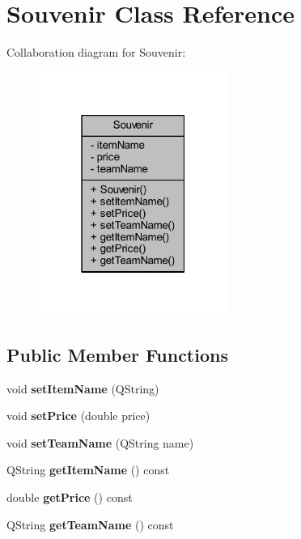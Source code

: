 \hypertarget{class_souvenir}{}\section{Souvenir Class Reference}
\label{class_souvenir}


Collaboration diagram for Souvenir\+:\nopagebreak
\begin{figure}[H]
\begin{center}
\leavevmode
\includegraphics[width=175pt]{class_souvenir__coll__graph}
\end{center}
\end{figure}
\subsection*{Public Member Functions}
\begin{DoxyCompactItemize}
\item 
\mbox{\label{class_souvenir_a968ad05d980d8284b891d760b4338553}} 
void {\bfseries set\+Item\+Name} (Q\+String)
\item 
\mbox{\label{class_souvenir_a3664ce2aa3d258e6bf21e2f0f3741efe}} 
void {\bfseries set\+Price} (double price)
\item 
\mbox{\label{class_souvenir_aadd5431a88f683445ce407cbfd4b0390}} 
void {\bfseries set\+Team\+Name} (Q\+String name)
\item 
\mbox{\label{class_souvenir_a0b74aa98dac5f6d6b2541752ec431a82}} 
Q\+String {\bfseries get\+Item\+Name} () const
\item 
\mbox{\label{class_souvenir_aa3dfe5b64bfc5e3785cefd90759e281f}} 
double {\bfseries get\+Price} () const
\item 
\mbox{\label{class_souvenir_ab52b658cab6e30ca568a70df08797d8c}} 
Q\+String {\bfseries get\+Team\+Name} () const
\end{DoxyCompactItemize}
